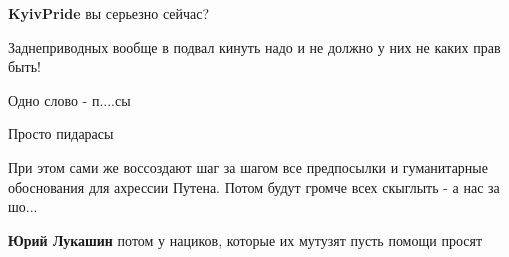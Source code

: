 \begin{itemize}
 
\textbf{KyivPride} вы серьезно сейчас?

 
Заднеприводных вообще в подвал кинуть надо и не должно у них не каких прав быть!

 
Одно слово - п....сы

 
Просто пидарасы🤗

 

При этом сами же воссоздают шаг за шагом все предпосылки и гуманитарные
обоснования для ахрессии Путена. Потом будут громче всех скыглыть - а нас за
шо...

\begin{itemize}
 
\textbf{Юрий Лукашин} потом у нациков, которые их мутузят пусть помощи просят
\end{itemize}

 


\end{itemize}
